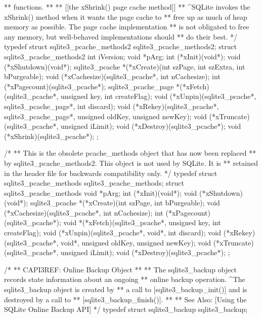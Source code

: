 \begin{Codex}[label=sqlite3.h,numbers=left]
{** functions.
**
** [[the xShrink() page cache method]]
** ^SQLite invokes the xShrink() method when it wants the page cache to
** free up as much of heap memory as possible.  The page cache implementation
** is not obligated to free any memory, but well-behaved implementations should
** do their best.
*/
typedef struct sqlite3_pcache_methods2 sqlite3_pcache_methods2;
struct sqlite3_pcache_methods2 {
  int iVersion;
  void *pArg;
  int (*xInit)(void*);
  void (*xShutdown)(void*);
  sqlite3_pcache *(*xCreate)(int szPage, int szExtra, int bPurgeable);
  void (*xCachesize)(sqlite3_pcache*, int nCachesize);
  int (*xPagecount)(sqlite3_pcache*);
  sqlite3_pcache_page *(*xFetch)(sqlite3_pcache*, unsigned key, int createFlag);
  void (*xUnpin)(sqlite3_pcache*, sqlite3_pcache_page*, int discard);
  void (*xRekey)(sqlite3_pcache*, sqlite3_pcache_page*, 
      unsigned oldKey, unsigned newKey);
  void (*xTruncate)(sqlite3_pcache*, unsigned iLimit);
  void (*xDestroy)(sqlite3_pcache*);
  void (*xShrink)(sqlite3_pcache*);
};

/*
** This is the obsolete pcache_methods object that has now been replaced
** by sqlite3_pcache_methods2.  This object is not used by SQLite.  It is
** retained in the header file for backwards compatibility only.
*/
typedef struct sqlite3_pcache_methods sqlite3_pcache_methods;
struct sqlite3_pcache_methods {
  void *pArg;
  int (*xInit)(void*);
  void (*xShutdown)(void*);
  sqlite3_pcache *(*xCreate)(int szPage, int bPurgeable);
  void (*xCachesize)(sqlite3_pcache*, int nCachesize);
  int (*xPagecount)(sqlite3_pcache*);
  void *(*xFetch)(sqlite3_pcache*, unsigned key, int createFlag);
  void (*xUnpin)(sqlite3_pcache*, void*, int discard);
  void (*xRekey)(sqlite3_pcache*, void*, unsigned oldKey, unsigned newKey);
  void (*xTruncate)(sqlite3_pcache*, unsigned iLimit);
  void (*xDestroy)(sqlite3_pcache*);
};


/*
** CAPI3REF: Online Backup Object
**
** The sqlite3_backup object records state information about an ongoing
** online backup operation.  ^The sqlite3_backup object is created by
** a call to [sqlite3_backup_init()] and is destroyed by a call to
** [sqlite3_backup_finish()].
**
** See Also: [Using the SQLite Online Backup API]
*/
typedef struct sqlite3_backup sqlite3_backup;

}
\end{Codex}
